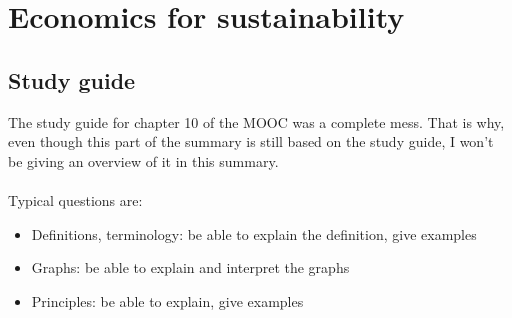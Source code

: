 \documentclass[../summary.tex]{subfiles}
\begin{document}
	
	\section{Economics for sustainability}
	
	\subsection{Study guide}
	
	The study guide for chapter 10 of the MOOC was a complete mess. That is why, even though this part of the summary is still based on the study guide, I won't be giving an overview of it in this summary.
	\\\\
	Typical questions are:
	\begin{itemize}
		\item Definitions, terminology: be able to explain the definition, give examples
		\item Graphs: be able to explain and interpret the graphs
		\item Principles: be able to explain, give examples
	\end{itemize}
	
	
\end{document}
